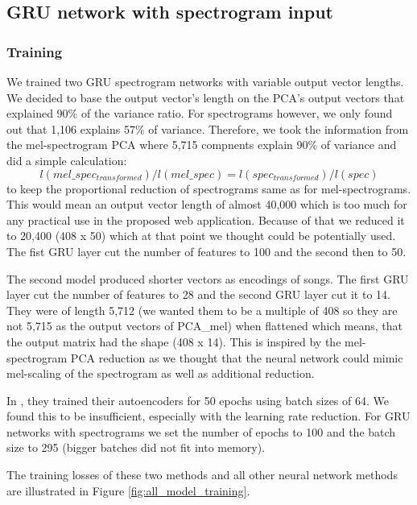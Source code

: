 \subsection{GRU network with spectrogram input}\label{ssec:GRU_spec_experiments}

\subsubsection{Training}

We trained two GRU spectrogram networks with variable output vector lengths. We decided to base the output vector's length on the PCA's output vectors that explained 90\% of the variance ratio. For spectrograms however, we only found out that 1,106 explains 57\% of variance. Therefore, we took the information from the mel-spectrogram PCA where 5,715 compnents explain 90\% of variance and did a simple calculation: $$ l(mel\_spec_{transformed})/l(mel\_spec) = l(spec_{transformed})/l(spec) $$ to keep the proportional reduction of spectrograms same as for mel-spectrograms. This would mean an output vector length of almost 40,000 which is too much for any practical use in the proposed web application. Because of that we reduced it to 20,400 (408 x 50) which at that point we thought could be potentially used. The fist GRU layer cut the number of features to 100 and the second then to 50.

The second model produced shorter vectors as encodings of songs. The first GRU layer cut the number of features to 28 and the second GRU layer cut it to 14. They were of length 5,712 (we wanted them to be a multiple of 408 so they are not 5,715 as the output vectors of PCA\_mel) when flattened which means, that the output matrix had the shape (408 x 14). This is inspired by the mel-spectrogram PCA reduction as we thought that the neural network could mimic mel-scaling of the spectrogram as well as additional reduction. 

In \cite{inproceedings_RNNs}, they trained their autoencoders for 50 epochs using batch sizes of 64. We found this to be insufficient, especially with the learning rate reduction. For GRU networks with spectrograms we set the number of epochs to 100 and the batch size to 295 (bigger batches did not fit into memory). 

The training losses of these two methods and all other neural network methods are illustrated in Figure \ref{fig:all_model_training}. 

